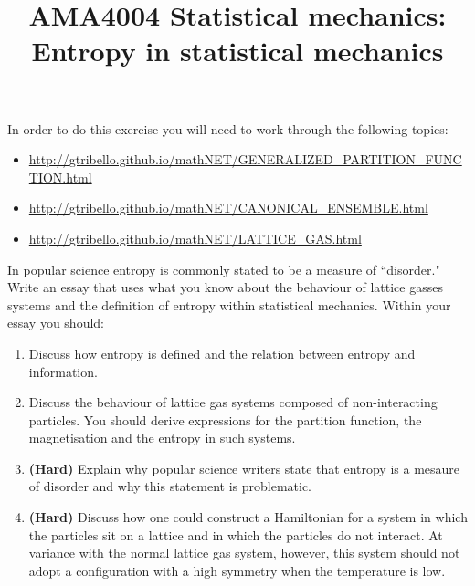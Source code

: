\documentclass[a4paper]{article}
\title{
\vspace{-3em}
\begin{tcolorbox}
\Huge\sffamily AMA4004 Statistical mechanics: Entropy in statistical mechanics   
\end{tcolorbox}
\vspace{-3em}
}
\date{}
\begin{document}
\maketitle

In order to do this exercise you will need to work through the following topics:

\begin{itemize}
\item \href{http://gtribello.github.io/mathNET/GENERALIZED\_PARTITION\_FUNCTION.html}{http://gtribello.github.io/mathNET/GENERALIZED\_PARTITION\_FUNCTION.html}
\item \href{http://gtribello.github.io/mathNET/CANONICAL\_ENSEMBLE.html}{http://gtribello.github.io/mathNET/CANONICAL\_ENSEMBLE.html}
\item \href{http://gtribello.github.io/mathNET/LATTICE\_GAS.html}{http://gtribello.github.io/mathNET/LATTICE\_GAS.html}
\end{itemize}

In popular science entropy is commonly stated to be a measure of ``disorder."  Write an essay that uses what you know about the behaviour of lattice gasses systems and the definition of entropy within statistical mechanics. Within your essay you should:

\begin{enumerate}
\item Discuss how entropy is defined and the relation between entropy and information.  
\item Discuss the behaviour of lattice gas systems composed of non-interacting particles. You should derive expressions for the partition function, the magnetisation and the entropy in such systems.
\item {\bf (Hard)} Explain why popular science writers state that entropy is a mesaure of disorder and why this statement is problematic.
\item {\bf (Hard)} Discuss how one could construct a Hamiltonian for a system in which the particles sit on a lattice and in which the particles do not interact.  At variance with the normal lattice gas system, however, this system should not adopt a configuration with a high symmetry when the temperature is low.
\end{enumerate}
\end{document}
